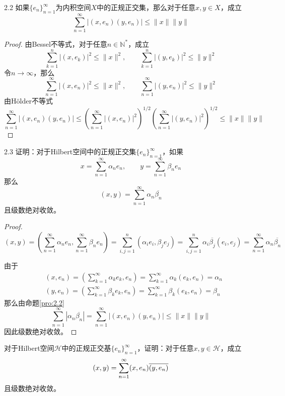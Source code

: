 \documentclass[lang = cn, scheme = chinese, 10pt]{elegantbook}
\newcommand{\N}{\mathbb{N}}  %
\begin{document}
\begin{proposition}{}{2.2}
	如果$\{e_n\}_{n=1}^{\infty}$为内积空间$X$中的正规正交集，那么对于任意$x,y\in X$，成立
	$$
	\sum_{n=1}^{\infty}|(x,e_n)(y,e_n)|\le \|x\| \|y\|
	$$
\end{proposition}

\begin{proof}
	由Bessel不等式，对于任意$n\in\N^*$，成立
	$$
	\sum_{k=1}^{n}|(x,e_k)|^2\le \|x\|^2,\qquad 
	\sum_{k=1}^{n}|(y,e_k)|^2\le \|y\|^2
	$$
	令$n\to\infty$，那么
	$$
	\sum_{n=1}^{\infty}|(x,e_n)|^2\le \|x\|^2,\qquad 
	\sum_{n=1}^{\infty}|(y,e_n)|^2\le \|y\|^2
	$$
	由Hölder不等式
	$$
	\sum_{n=1}^{\infty}|(x,e_n)(y,e_n)|\le
	\left(\sum_{n=1}^{\infty}|(x,e_n)|^2\right)^{1/2}\left(\sum_{n=1}^{\infty}|(y,e_n)|^2\right)^{1/2}\le
	\|x\|\|y\|
	$$
\end{proof}

\begin{proposition}{}{2.3}
	证明：对于Hilbert空间中的正规正交集$\{e_n\}_{n=1}^{\infty}$，如果
	$$
	x=\sum_{n=1}^{\infty}\alpha_n e_n,\qquad
	y=\sum_{n=1}^{\infty}\beta_n e_n
	$$
	那么
	$$
	(x,y)=\sum_{n=1}^{\infty}\alpha_n \overline{\beta_n}
	$$
	且级数绝对收敛。
\end{proposition}

\begin{proof}
	$$
	(x,y)
	= \left(\sum_{n=1}^{\infty}\alpha_n e_n,\sum_{n=1}^{\infty}\beta_n e_n\right)
	= \sum_{i,j=1}^{n}(\alpha_i e_i,\beta_j e_j)
	= \sum_{i,j=1}^{n}\alpha_i\overline{\beta_j}(e_i,e_j)
	= \sum_{n=1}^{\infty}\alpha_n \overline{\beta_n}
	$$
	
	由于
	\begin{align*}
		& (x,e_n)
		= \left(\sum_{k=1}^{\infty}\alpha_k e_k,e_n\right)
		= \sum_{k=1}^{\infty}\alpha_k (e_k,e_n)
		= \alpha_n\\
		& (y,e_n)
		= \left(\sum_{k=1}^{\infty}\beta_k e_k,e_n\right)
		= \sum_{k=1}^{\infty}\beta_k (e_k,e_n)
		= \beta_n
	\end{align*}
	那么由命题\ref{pro:2.2}
	$$
	\sum_{n=1}^{\infty}|\alpha_n\overline{\beta_n}|=
	\sum_{n=1}^{\infty}|(x,e_n)(y,e_n)|\le \|x\| \|y\|
	$$
	因此级数绝对收敛。
\end{proof}

\begin{proposition}
	对于Hilbert空间$\mathcal{H}$中的正规正交基$\{e_n\}_{n=1}^{\infty}$，证明：对于任意$x,y\in \mathcal{H}$，成立
	$$
	(x,y)=\sum_{n=1}^{\infty}(x,e_n)\overline{(y,e_n)}\\
	$$
	且级数绝对收敛。
\end{proposition}
\end{document}
